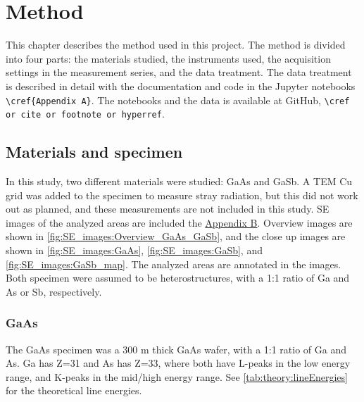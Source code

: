 \chapter{Method}
\label{ch:method}


This chapter describes the method used in this project.
The method is divided into four parts: the materials studied, the instruments used, the acquisition settings in the measurement series, and the data treatment.
The data treatment is described in detail with the documentation and code in the Jupyter notebooks \verb|\cref{Appendix A}|.
The notebooks and the data is available at GitHub, \verb|\cref or cite or footnote or hyperref|.










\section{Materials and specimen}
\label{method:materials}

In this study, two different materials were studied: GaAs and GaSb.
A TEM Cu grid was added to the specimen to measure stray radiation, but this did not work out as planned, and these measurements are not included in this study.
SE images of the analyzed areas are included the \hyperref[appendix:SE_images]{Appendix B}.
Overview images are shown in \cref{fig:SE_images:Overview_GaAs_GaSb}, and the close up images are shown in \cref{fig:SE_images:GaAs}, \cref{fig:SE_images:GaSb}, and \cref{fig:SE_images:GaSb_map}.
The analyzed areas are annotated in the images.
Both specimen were assumed to be heterostructures, with a 1:1 ratio of Ga and As or Sb, respectively.


\subsection{GaAs}
\label{method:materials:gaas}

The GaAs specimen was a 300 \textmu m thick GaAs wafer, with a 1:1 ratio of Ga and As.
Ga has Z=31 and As has Z=33, where both have L-peaks in the low energy range, and K-peaks in the mid/high energy range.
See \cref{tab:theory:lineEnergies} for the theoretical line energies.

